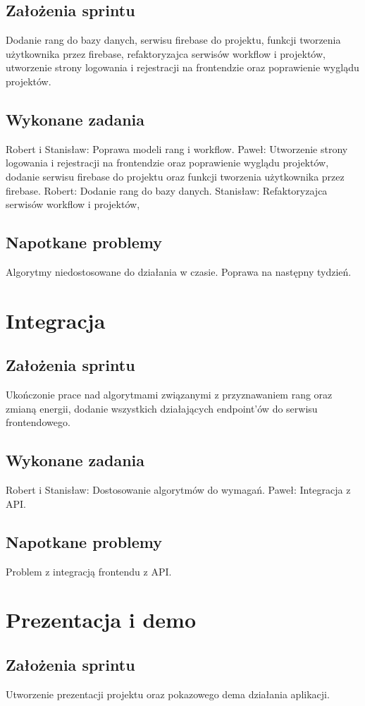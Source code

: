 \documentclass[a4paper,11pt]{report}
\begin{document}
\subsection {Założenia sprintu}
Dodanie rang do bazy danych, serwisu firebase do projektu, funkcji tworzenia użytkownika przez firebase, refaktoryzajca serwisów workflow i projektów, utworzenie strony logowania i rejestracji na frontendzie oraz poprawienie wyglądu projektów.
\subsection {Wykonane zadania}
Robert i Stanisław: Poprawa modeli rang i workflow.
Paweł: Utworzenie strony logowania i rejestracji na frontendzie oraz poprawienie wyglądu projektów, dodanie serwisu firebase do projektu oraz funkcji tworzenia użytkownika przez firebase.
Robert: Dodanie rang do bazy danych.
Stanisław: Refaktoryzajca serwisów workflow i projektów,
\subsection {Napotkane problemy}
Algorytmy niedostosowane do działania w czasie. Poprawa na następny tydzień.

\section {Integracja}
\subsection {Założenia sprintu}
Ukończonie prace nad algorytmami związanymi z przyznawaniem rang oraz zmianą energii, dodanie wszystkich działających endpoint’ów do serwisu frontendowego.
\subsection {Wykonane zadania}
Robert i Stanisław: Dostosowanie algorytmów do wymagań. 
Paweł: Integracja z API.
\subsection {Napotkane problemy}
Problem z integracją frontendu z API.

\section {Prezentacja i demo}
\subsection {Założenia sprintu}
Utworzenie prezentacji projektu oraz pokazowego dema działania aplikacji.
\end{document}
